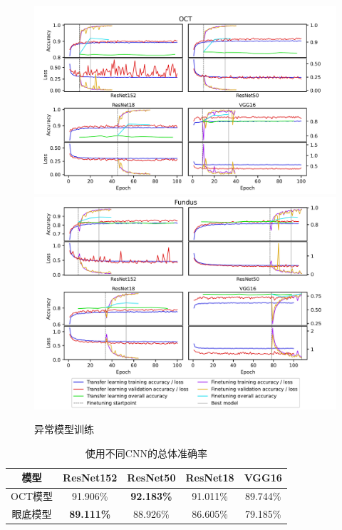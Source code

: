 \documentclass{article}
\begin{document}
		\begin{figure}[htbp]
			\centering
			\includegraphics[width=\linewidth]{Figs/abnormity_OCT_loss_and_acc.png}
			\includegraphics[width=\linewidth]{Figs/abnormity_Fundus_loss_and_acc.png}
			\caption{异常模型训练}
			\label{fig:A_train}
		\end{figure}
		
		\pagebreak
		
		{
		\fontsize{9}{12}\selectfont
		{
			\begin{table}
				\centering
				\caption{使用不同CNN的总体准确率}
				\label{tb:A_accuracies}
				\begin{tabular}{ccccc}
					\toprule
					模型&ResNet152&ResNet50&ResNet18&VGG16\\
					\midrule
					OCT模型   &91.906\%&\textbf{92.183\%}&91.011\%&89.744\% \\
					眼底模型&\textbf{89.111\%}&88.926\%&86.605\%&79.185\% \\
					\bottomrule
				\end{tabular}
			\end{table}
		}
		}	
		
\end{document}

